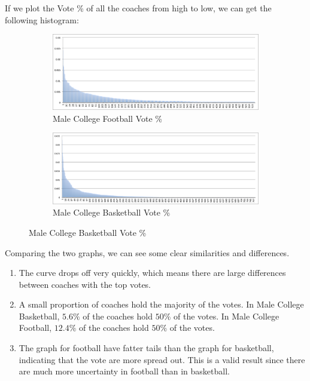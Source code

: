 \documentclass[titlepage]{article}
\begin{document}
\noindent If we plot the Vote \% of all the coaches from high to low, we can get the following histogram:

\begin{figure}[H]
      \centering
      \begin{subfigure}{1\textwidth}
      \caption{Male College Football Vote \%}
      \centering
      \includegraphics[width=1.1\textwidth]{graphs/football_score_dist.png}
      \end{subfigure}
      \begin{subfigure}{1\textwidth}
      \caption{Male College Basketball Vote \%}
      \centering
      \includegraphics[width=1.1\textwidth]{graphs/basketball_score_dist.png}
      \end{subfigure}
 \end{figure}

\noindent Comparing the two graphs, we can see some clear similarities and differences.

\begin{enumerate}
\item The curve drops off very quickly, which means there are large differences between coaches with the top votes.
\item A small proportion of coaches hold the majority of the votes. In Male College Basketball, $5.6\%$ of the coaches hold $50\%$ of the votes. In Male College Football, $12.4\%$ of the coaches hold $50\%$ of the votes.
\item The graph for football have fatter tails than the graph for basketball, indicating that the vote are more spread out. This is a valid result since there are much more uncertainty in football than in basketball.
\end{enumerate}
\end{document}
